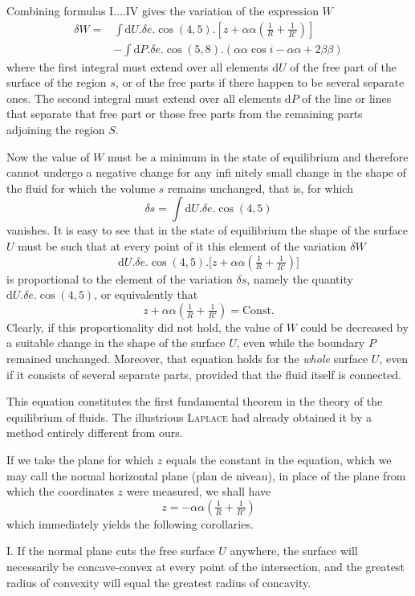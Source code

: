 Combining formulas I....IV gives the variation of the expression $W$
\[
\begin{aligned}
\delta W={}&\int\mathrm{d}U.\delta e.\cos(4,5).[z+\alpha\alpha(\frac{1}{R}+\frac{1}{R'})]\\
&-\int\mathrm{d}P.\delta e.\cos(5,8).(\alpha\alpha\cos i-\alpha\alpha+2\beta\beta)
\end{aligned}
\]
where the first integral must extend over all elements $\mathrm{d}U$ of the free part of the surface of the region $s$, or of the free parts if there happen to be several separate ones. The second integral must extend over all elements $\mathrm{d}P$ of the line or lines that separate that free part or those free parts from the remaining parts adjoining the region $S$.

Now the value of $W$ must be a minimum in the state of equilibrium and therefore cannot undergo a negative change for any infi%
nitely small change in the shape of the fluid for which the volume $s$ remains unchanged, that is, for which
\[
\delta s=\int\mathrm{d}U.\delta e.\cos(4,5)
\]
vanishes. It is easy to see that in the state of equilibrium the shape of the surface $U$ must be such that at every point of it this element of the variation $\delta W$
\[
\mathrm{d}U.\delta e.\cos(4,5).\bigl[z+\alpha\alpha(\tfrac1R+\tfrac1{R'})\bigr]
\]
is proportional to the element of the variation $\delta s$, namely the quantity $\mathrm{d}U.\delta e.\cos(4,5)$, or equivalently that
\[
z+\alpha\alpha(\tfrac1R+\tfrac1{R'})=\mathrm{Const.}
\]
Clearly, if this proportionality did not hold, the value of $W$ could be decreased by a suitable change in the shape of the surface $U$, even while the boundary $P$ remained unchanged. Moreover, that equation holds for the \textit{whole} surface $U$, even if it consists of several separate parts, provided that the fluid itself is connected.

This equation constitutes the first fundamental theorem in the theory of the equilibrium of fluids. The illustrious \textsc{Laplace} had already obtained it by a method entirely different from ours.

If we take the plane for which $z$ equals the constant in the equation, which we may call the normal horizontal plane (plan de niveau), in place of the plane from which the coordinates $z$ were measured, we shall have
\[
z=-\alpha\alpha(\tfrac1R+\tfrac1{R'})
\]
which immediately yields the following corollaries.

I. If the normal plane cuts the free surface $U$ anywhere, the surface will necessarily be concave-convex at every point of the intersection, and the greatest radius of convexity will equal the greatest radius of concavity.


